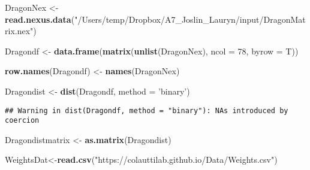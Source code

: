 \documentclass[
]{article}
\newenvironment{Shaded}{\begin{snugshade}}{\end{snugshade}}
\newcommand{\DataTypeTok}[1]{\textcolor[rgb]{0.13,0.29,0.53}{#1}}
\newcommand{\DecValTok}[1]{\textcolor[rgb]{0.00,0.00,0.81}{#1}}
\newcommand{\KeywordTok}[1]{\textcolor[rgb]{0.13,0.29,0.53}{\textbf{#1}}}
\newcommand{\NormalTok}[1]{#1}
\newcommand{\StringTok}[1]{\textcolor[rgb]{0.31,0.60,0.02}{#1}}
\begin{document}
\begin{Shaded}
\begin{Highlighting}[]
\NormalTok{DragonNex <-}\StringTok{ }\KeywordTok{read.nexus.data}\NormalTok{(}\StringTok{"/Users/temp/Dropbox/A7_Joslin_Lauryn/input/DragonMatrix.nex"}\NormalTok{)}
\end{Highlighting}
\end{Shaded}

\begin{Shaded}
\begin{Highlighting}[]
\NormalTok{Dragondf <-}\StringTok{ }\KeywordTok{data.frame}\NormalTok{(}\KeywordTok{matrix}\NormalTok{(}\KeywordTok{unlist}\NormalTok{(DragonNex), }\DataTypeTok{ncol =} \DecValTok{78}\NormalTok{, }\DataTypeTok{byrow =}\NormalTok{ T))}
\end{Highlighting}
\end{Shaded}

\begin{Shaded}
\begin{Highlighting}[]
\KeywordTok{row.names}\NormalTok{(Dragondf) <-}\StringTok{ }\KeywordTok{names}\NormalTok{(DragonNex)}
\end{Highlighting}
\end{Shaded}

\begin{Shaded}
\begin{Highlighting}[]
\NormalTok{Dragondist <-}\StringTok{ }\KeywordTok{dist}\NormalTok{(Dragondf, }\DataTypeTok{method =} \StringTok{'binary'}\NormalTok{)}
\end{Highlighting}
\end{Shaded}

\begin{verbatim}
## Warning in dist(Dragondf, method = "binary"): NAs introduced by coercion
\end{verbatim}

\begin{Shaded}
\begin{Highlighting}[]
\NormalTok{Dragondistmatrix <-}\StringTok{ }\KeywordTok{as.matrix}\NormalTok{(Dragondist)}
\end{Highlighting}
\end{Shaded}

\begin{Shaded}
\begin{Highlighting}[]
\NormalTok{WeightsDat<-}\KeywordTok{read.csv}\NormalTok{(}\StringTok{"https://colauttilab.github.io/Data/Weights.csv"}\NormalTok{)}
\end{Highlighting}
\end{Shaded}
\end{document}
